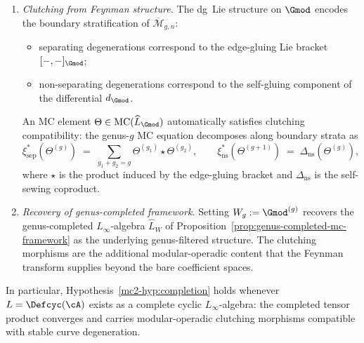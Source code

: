 \begin{proposition}
\begin{enumerate}[label=\textup{(\alph*)}]
\item \emph{Clutching from Feynman structure.}
  The dg~Lie structure on $\Gmod$ encodes the boundary
  stratification of $\overline{\mathcal{M}}_{g,n}$:
  \begin{itemize}
  \item separating degenerations correspond to the
    edge-gluing Lie bracket $[-,-]_{\Gmod}$;
  \item non-separating degenerations correspond to the
    self-gluing component of the differential $d_{\Gmod}$.
  \end{itemize}
  An MC element
  $\Theta \in \mathrm{MC}(\widehat{L}_{\Gmod})$
  automatically satisfies clutching compatibility: the genus-$g$
  MC equation decomposes along boundary strata as
  \begin{equation}\label{eq:clutching-factorization}
  \xi_{\mathrm{sep}}^*(\Theta^{(g)})
  \;=\;
  \sum_{g_1+g_2=g}
  \Theta^{(g_1)} \star \Theta^{(g_2)},
  \qquad
  \xi_{\mathrm{ns}}^*(\Theta^{(g+1)})
  \;=\;
  \Delta_{\mathrm{ns}}(\Theta^{(g)}),
  \end{equation}
  where $\star$ is the product induced by the edge-gluing bracket
  and $\Delta_{\mathrm{ns}}$ is the self-sewing coproduct.

\item \emph{Recovery of genus-completed framework.}
  Setting $W_g := {\Gmod}^{(g)}$ recovers the genus-completed
  $L_\infty$-algebra $\widehat{L}_W$ of
  Proposition~\textup{\ref{prop:genus-completed-mc-framework}}
  as the underlying genus-filtered structure.  The clutching
  morphisms are the additional modular-operadic content that the
  Feynman transform supplies beyond the bare coefficient spaces.
\end{enumerate}
In particular, Hypothesis~\textup{\ref{mc2-hyp:completion}} holds
whenever $L = \Defcyc(\cA)$ exists as a complete cyclic
$L_\infty$-algebra: the completed tensor product converges and
carries modular-operadic clutching morphisms compatible with
stable curve degeneration.
\end{proposition}

